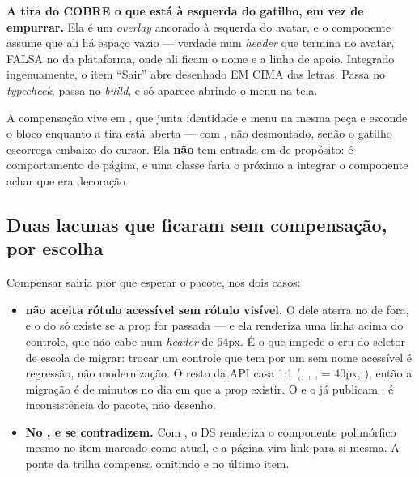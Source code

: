 \begin{atencao}
\textbf{A tira do  COBRE o que está à esquerda do gatilho, em vez
de empurrar.} Ela é um \emph{overlay} ancorado à esquerda do avatar, e o
componente assume que ali há espaço vazio --- verdade num \emph{header} que
termina no avatar, FALSA no da plataforma, onde ali ficam o nome e a linha de
apoio. Integrado ingenuamente, o item \enquote{Sair} abre desenhado EM CIMA das
letras. Passa no \emph{typecheck}, passa no \emph{build}, e só aparece abrindo o
menu na tela.

A compensação vive em , que junta
identidade e menu na mesma peça e esconde o bloco enquanto a tira está aberta
--- com , não desmontado, senão o gatilho escorrega embaixo do
cursor. Ela \textbf{não} tem entrada em  de propósito: é
comportamento de página, e uma classe faria o próximo a integrar o componente
achar que era decoração.
\end{atencao}

\subsection{Duas lacunas que ficaram sem compensação, por escolha}

Compensar sairia pior que esperar o pacote, nos dois casos:

\begin{itemize}
  \item \textbf{ não aceita rótulo acessível sem rótulo visível.}
    O  dele aterra no  de fora, e o  do
     só existe se a prop  for passada --- e ela renderiza
    uma linha acima do controle, que não cabe num \emph{header} de 64px. É o que
    impede o  cru do seletor de escola de migrar: trocar um controle
    que tem  por um sem nome acessível é regressão, não
    modernização. O resto da API casa 1:1 (, ,
    ,  = 40px, ), então a migração é de
    minutos no dia em que a prop existir. O  e o  já
    publicam : é inconsistência do pacote, não desenho.
  \item \textbf{No ,  e  se contradizem.}
    Com , o DS renderiza o componente polimórfico mesmo no item marcado
    como atual, e a página vira link para si mesma. A ponte da trilha compensa
    omitindo  e  no último item.
\end{itemize}

